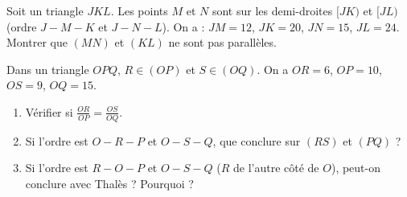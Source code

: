 \documentclass[11pt]{article}
\begin{document}
\begin{exercice}
Soit un triangle $JKL$. Les points $M$ et $N$ sont sur les demi-droites $[JK)$ et $[JL)$ (ordre $J-M-K$ et $J-N-L$).
On a : $JM = 12$, $JK = 20$, $JN = 15$, $JL = 24$.
Montrer que $(MN)$ et $(KL)$ ne sont pas parallèles.
\end{exercice}

\begin{exercice}
Dans un triangle $OPQ$, $R \in (OP)$ et $S \in (OQ)$.
On a $OR = 6$, $OP = 10$, $OS = 9$, $OQ = 15$.
\begin{enumerate}
    \item Vérifier si $\frac{OR}{OP} = \frac{OS}{OQ}$.
    \item Si l'ordre est $O-R-P$ et $O-S-Q$, que conclure sur $(RS)$ et $(PQ)$ ?
    \item Si l'ordre est $R-O-P$ et $O-S-Q$ ($R$ de l'autre côté de $O$), peut-on conclure avec Thalès ? Pourquoi ?
\end{enumerate}
\end{exercice}
\end{document}
